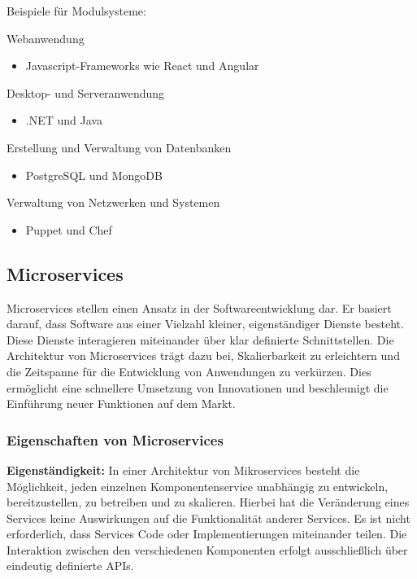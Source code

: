 Beispiele für Modulsysteme:

Webanwendung
\begin{itemize}
    \item Javascript-Frameworks wie React und Angular
\end{itemize}

Desktop- und Serveranwendung
\begin{itemize}
    \item .NET und Java
\end{itemize}

Erstellung und Verwaltung von Datenbanken
\begin{itemize}
    \item PostgreSQL und MongoDB
\end{itemize}

Verwaltung von Netzwerken und Systemen
\begin{itemize}
    \item Puppet und Chef
\end{itemize}

\newpage
\subsection*{Microservices}

Microservices stellen einen Ansatz in der Softwareentwicklung dar. Er basiert darauf, 
dass Software aus einer Vielzahl kleiner, eigenständiger Dienste besteht. 
Diese Dienste interagieren miteinander über klar definierte Schnittstellen.
Die Architektur von Microservices trägt dazu bei, Skalierbarkeit zu erleichtern und die 
Zeitspanne für die Entwicklung von Anwendungen zu verkürzen. 
Dies ermöglicht eine schnellere Umsetzung von Innovationen und beschleunigt die Einführung 
neuer Funktionen auf dem Markt.

\subsubsection*{Eigenschaften von Microservices}

\textbf{Eigenständigkeit:}
In einer Architektur von Mikroservices besteht die Möglichkeit, jeden einzelnen Komponentenservice 
unabhängig zu entwickeln, bereitzustellen, zu betreiben und zu skalieren. 
Hierbei hat die Veränderung eines Services keine Auswirkungen auf die Funktionalität anderer Services. 
Es ist nicht erforderlich, dass Services Code oder Implementierungen miteinander teilen. 
Die Interaktion zwischen den verschiedenen Komponenten erfolgt ausschließlich 
über eindeutig definierte APIs.

